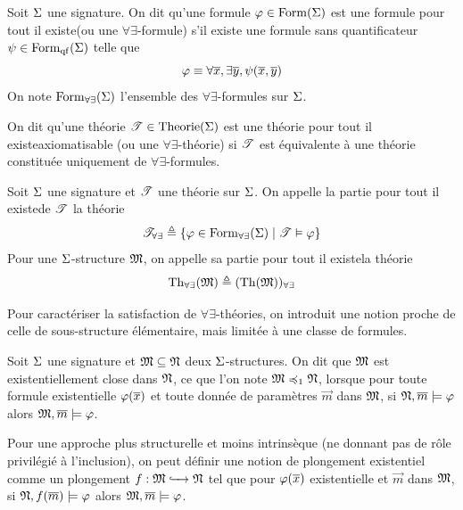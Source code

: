 \begin{definition}
  Soit $\Sigma$ une signature. On dit qu'une formule $\varphi\in\operatorname{Form}(\Sigma)$
  est une formule \og pour tout il existe\fg (ou une $\forall\exists$-formule)
  s'il existe une formule sans quantificateur $\psi\in\operatorname{Form}_{\mathrm{qf}}(\Sigma)$ telle
  que
  \[\varphi\equiv \forall \overline{x},\exists \overline{y},\psi(\overline{x},\overline{y})\]
  On note $\operatorname{Form}_{\forall\exists}(\Sigma)$ l'ensemble des
  $\forall\exists$-formules sur $\Sigma$.
  
  On dit qu'une théorie $\mathscr T\in\operatorname{Theorie}(\Sigma)$ est une théorie
  \og pour tout il existe\fg axiomatisable (ou une $\forall\exists$-théorie)
  si $\mathscr T$ est équivalente à une théorie constituée uniquement de
  $\forall\exists$-formules.
\end{definition}

\begin{definition}
  Soit $\Sigma$ une signature et $\mathscr T$ une théorie sur $\Sigma$. On appelle la
  partie \og pour tout il existe\fg de $\mathscr T$ la théorie
  \[\mathscr T_{\forall\exists} \triangleq
  \left\{ \varphi\in\operatorname{Form}_{\forall\exists}(\Sigma) \;\middle\vert\; \mathscr T\vDash\varphi \right\}\]
  Pour une $\Sigma$-structure $\mathfrak{M}$, on appelle sa partie \og pour tout il
  existe\fg la théorie
  \[\operatorname{Th}_{\forall\exists}(\mathfrak{M})\triangleq(\operatorname{Th}(\mathfrak{M}))_{\forall\exists}\]
\end{definition}

Pour caractériser la satisfaction de $\forall\exists$-théories, on introduit une
notion proche de celle de sous-structure élémentaire, mais limitée à une classe
de formules.

\begin{definition}
  Soit $\Sigma$ une signature et $\mathfrak{M}\subseteq\mathfrak{N}$ deux $\Sigma$-structures.
  On dit que $\mathfrak{M}$ est existentiellement close dans $\mathfrak{N}$, ce que l'on
  note $\mathfrak{M}\preccurlyeq_{1}\mathfrak{N}$, lorsque pour toute formule existentielle
  $\varphi(\overline{x})$ et toute donnée de paramètres $\vec m$ dans $\mathfrak{M}$, si
  $\mathfrak{N},\overline{m}\models\varphi$ alors $\mathfrak{M},\overline{m}\models\varphi$.
  \index[notation]{$\subModEx$}
\end{definition}

\begin{remark}
  Pour une approche plus structurelle et moins intrinsèque (ne donnant pas de
  rôle privilégié à l'inclusion), on peut définir une notion de plongement
  existentiel comme un plongement $f : \displaystyle \mathfrak{M} \xhookrightarrow{\quad} \mathfrak{N}$
  tel que pour $\varphi(\overline{x})$ existentielle et $\vec m$ dans $\mathfrak{M}$,
  si $\mathfrak{N},f(\overline{m})\models\varphi$ alors $\mathfrak{M},\overline{m}\models\varphi$.
\end{remark}

